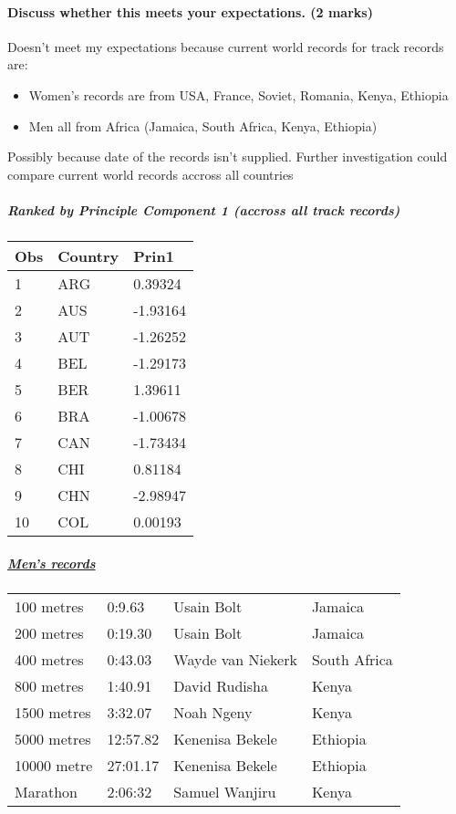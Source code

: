 \documentclass[11pt]{article}
\providecommand{\tightlist}{%
      \setlength{\itemsep}{0pt}\setlength{\parskip}{0pt}}
\begin{document}
    \hypertarget{discuss-whether-this-meets-your-expectations.-2-marks}{%
\paragraph{Discuss whether this meets your expectations. (2
marks)}\label{discuss-whether-this-meets-your-expectations.-2-marks}}

    Doesn't meet my expectations because current world records for track
records are:

\begin{itemize}
\tightlist
\item
  Women's records are from USA, France, Soviet, Romania, Kenya, Ethiopia
\item
  Men all from Africa (Jamaica, South Africa, Kenya, Ethiopia)
\end{itemize}

Possibly because date of the records isn't supplied. Further
investigation could compare current world records accross all countries

    \hypertarget{ranked-by-principle-component-1-accross-all-track-records}{%
\subparagraph{Ranked by Principle Component 1 (accross all track
records)}\label{ranked-by-principle-component-1-accross-all-track-records}}

\begin{longtable}[]{@{}lll@{}}
\toprule
Obs & Country & Prin1\tabularnewline
\midrule
\endhead
1 & ARG & 0.39324\tabularnewline
2 & AUS & -1.93164\tabularnewline
3 & AUT & -1.26252\tabularnewline
4 & BEL & -1.29173\tabularnewline
5 & BER & 1.39611\tabularnewline
6 & BRA & -1.00678\tabularnewline
7 & CAN & -1.73434\tabularnewline
8 & CHI & 0.81184\tabularnewline
9 & CHN & -2.98947\tabularnewline
10 & COL & 0.00193\tabularnewline
\bottomrule
\end{longtable}

\hypertarget{mens-records}{%
\subparagraph{\texorpdfstring{\href{https://en.wikipedia.org/wiki/List_of_Olympic_records_in_athletics\#Men's_records}{Men's
records}}{Men's records}}\label{mens-records}}

\begin{longtable}[]{@{}llll@{}}
\toprule
\endhead
100 metres & 0:9.63 & Usain Bolt & Jamaica\tabularnewline
200 metres & 0:19.30 & Usain Bolt & Jamaica\tabularnewline
400 metres & 0:43.03 & Wayde van Niekerk & South Africa\tabularnewline
800 metres & 1:40.91 & David Rudisha & Kenya\tabularnewline
1500 metres & 3:32.07 & Noah Ngeny & Kenya\tabularnewline
5000 metres & 12:57.82 & Kenenisa Bekele & Ethiopia\tabularnewline
10000 metre & 27:01.17 & Kenenisa Bekele & Ethiopia\tabularnewline
Marathon & 2:06:32 & Samuel Wanjiru & Kenya\tabularnewline
\bottomrule
\end{longtable}
\end{document}
